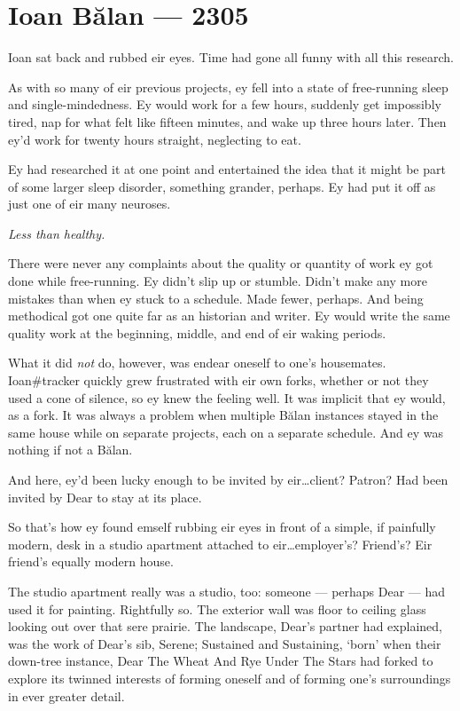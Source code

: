 \hypertarget{ioan-bux103lan-2305}{%
\chapter*{Ioan Bălan — 2305}\label{ioan-bux103lan-2305}}

Ioan sat back and rubbed eir eyes. Time had gone all funny with all this research.

As with so many of eir previous projects, ey fell into a state of free-running sleep and single-mindedness. Ey would work for a few hours, suddenly get impossibly tired, nap for what felt like fifteen minutes, and wake up three hours later. Then ey'd work for twenty hours straight, neglecting to eat.

Ey had researched it at one point and entertained the idea that it might be part of some larger sleep disorder, something grander, perhaps. Ey had put it off as just one of eir many neuroses.

\emph{Less than healthy.}

There were never any complaints about the quality or quantity of work ey got done while free-running. Ey didn't slip up or stumble. Didn't make any more mistakes than when ey stuck to a schedule. Made fewer, perhaps. And being methodical got one quite far as an historian and writer. Ey would write the same quality work at the beginning, middle, and end of eir waking periods.

What it did \emph{not} do, however, was endear oneself to one's housemates. Ioan\#tracker quickly grew frustrated with eir own forks, whether or not they used a cone of silence, so ey knew the feeling well. It was implicit that ey would, as a fork. It was always a problem when multiple Bălan instances stayed in the same house while on separate projects, each on a separate schedule. And ey was nothing if not a Bălan.

And here, ey'd been lucky enough to be invited by eir\ldots{}client? Patron? Had been invited by Dear to stay at its place.

So that's how ey found emself rubbing eir eyes in front of a simple, if painfully modern, desk in a studio apartment attached to eir\ldots{}employer's? Friend's? Eir friend's equally modern house.

The studio apartment really was a studio, too: someone — perhaps Dear — had used it for painting. Rightfully so. The exterior wall was floor to ceiling glass looking out over that sere prairie. The landscape, Dear's partner had explained, was the work of Dear's sib, Serene; Sustained and Sustaining, `born' when their down-tree instance, Dear The Wheat And Rye Under The Stars had forked to explore its twinned interests of forming oneself and of forming one's surroundings in ever greater detail.

